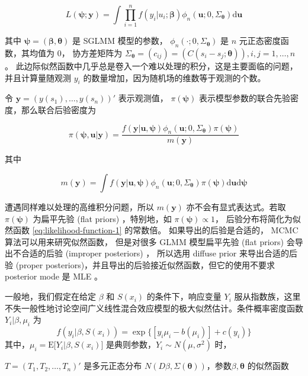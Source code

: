 \documentclass[12pt,a4paper,UTF8,twoside]{book}
\theoremstyle{definition}
\theoremstyle{definition}
\theoremstyle{definition}
\theoremstyle{remark}
\begin{document}
\begin{equation}
L(\boldsymbol{\psi};\mathbf{y}) = \int \prod_{i=1}^{n} f(y_i|u_i;\boldsymbol{\beta})\phi_{n}(\mathbf{u};0,\Sigma_{\boldsymbol{\theta}})\mathrm{d}\mathbf{u} \label{eq:likelihood-function-1}
\end{equation}

\noindent 其中
\(\boldsymbol{\psi} = (\boldsymbol{\beta},\boldsymbol{\theta})\) 是
SGLMM 模型的参数， \(\phi_{n}(\cdot;0,\Sigma_{\boldsymbol{\theta}})\) 是
\(n\) 元正态密度函数，其均值为 0， 协方差矩阵为
\(\Sigma_{\boldsymbol{\theta}} = (c_{ij}) = (C(s_i - s_j; \boldsymbol{\theta})), i,j = 1,\ldots,n\)。
此边际似然函数中几乎总是卷入一个难以处理的积分，这是主要面临的问题，并且计算量随观测
\(y_i\) 的数量增加，因为随机场的维数等于观测的个数。

令 \(\mathbf{y} = (y(s_1),\ldots,y(s_n))'\) 表示观测值，
\(\pi(\boldsymbol{\psi})\)
表示模型参数的联合先验密度，那么联合后验密度为

\[
\pi(\boldsymbol{\psi},\mathbf{u}|\mathbf{y}) = \frac{f(\mathbf{y|\mathbf{u}, \boldsymbol{\psi}})\phi_{n}(\mathbf{u};0,\Sigma_{\boldsymbol{\theta}})\pi(\boldsymbol{\psi})}{m(\mathbf{y})}
\]

\noindent 其中

\[
m(\mathbf{y}) = \int f(\mathbf{y|\mathbf{u}, \boldsymbol{\psi}})\phi_{n}(\mathbf{u};0,\Sigma_{\boldsymbol{\theta}})\pi(\boldsymbol{\psi})\mathrm{d} \mathbf{u} \mathrm{d} \boldsymbol{\psi}
\]

\noindent 遭遇同样难以处理的高维积分问题，所以 \(m(\mathbf{y})\)
亦不会有显式表达式。若取 \(\pi(\boldsymbol{\psi})\) 为扁平先验 (flat
priors) ，特别地，如 \(\pi(\boldsymbol{\psi}) \propto 1\)，
后验分布将简化为似然函数 \eqref{eq:likelihood-function-1} 的常数倍。
如果导出的后验是合适的， MCMC 算法可以用来研究似然函数， 但是对很多 GLMM
模型扁平先验 (flat priors) 会导出不合适的后验 (improper posteriors)
\citep{Natarajan1995}， 所以选用 diffuse prior 来导出合适的后验 (proper
posteriors)，并且导出的后验接近似然函数，但它的使用不要求 posterior mode
是 MLE \citep{Robert1996JASA}。

一般地，我们假定在给定 \(\beta\) 和 \(S(x_i)\) 的条件下，响应变量
\(Y_i\)
服从指数族，这里不失一般性地讨论空间广义线性混合效应模型的极大似然估计。条件概率密度函数
\(Y_i|\beta,\mu_i\) 为
\[f(y_i|\beta,S(x_i))=\exp\{ [y_{i}\mu_i-b(\mu_i)] + c(y_i) \}\]
其中，\(\mu_i = \mathrm{E}\big[Y_i|\beta,S(x_i)\big]\)
是典则参数，\(Y_i \sim N(\mu,\sigma^2)\) 时，

\(T = (T_1,T_2,\ldots,T_n)'\) 是多元正态分布
\(N(D\beta,\Sigma(\boldsymbol{\theta}))\)，参数\(\beta,\boldsymbol{\theta}\)
的似然函数
\end{document}
